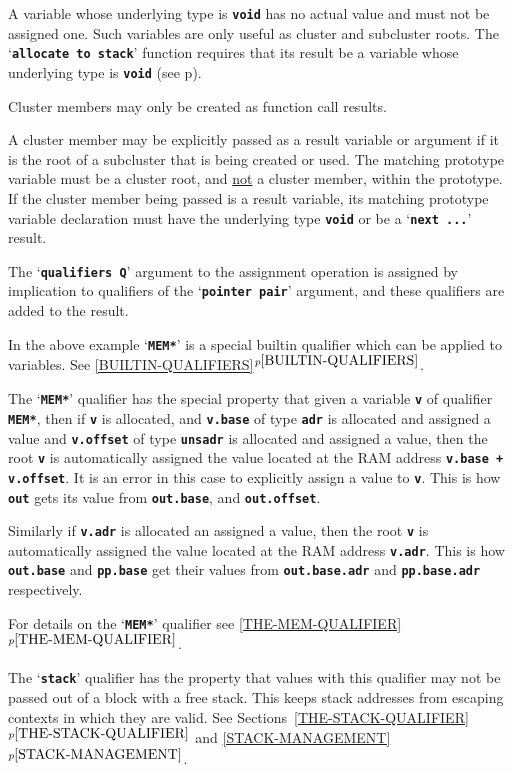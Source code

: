 \documentclass[12pt]{article}
\newcommand{\TT}[1]{{\tt \bfseries #1}}
\newcommand{\itemref}[1]{\ref{#1}$^{p\pageref{#1}}$}
\newcommand{\pagref}[1]{p\pageref{#1}}
\begin{document}
A variable whose underlying type is \TT{void} has no actual value
and must not be assigned one.  Such variables are only useful
as cluster and subcluster roots.  The `\TT{allocate to stack}'
function requires that its result be a variable whose underlying
type is \TT{void} (see \pagref{ALLOCATE-TO-STACK}).

Cluster members may only be created as function call results.

A cluster member may be explicitly passed as a result variable
or argument if it is the root of a subcluster that is being
created or used.  The matching prototype variable must
be a cluster root, and \underline{not} a cluster member,
within the prototype.  If the cluster member being passed is a
result variable, its matching prototype variable declaration must have the
underlying type \TT{void} or be a `\TT{next ...}' result.

The `\TT{qualifiers Q}' argument to the assignment operation
is assigned by implication to qualifiers of the `\TT{pointer pair}'
argument, and these qualifiers are added to the result.

In the above example `\TT{*MEM*}' is a special builtin qualifier
which can be applied to variables.
See \itemref{BUILTIN-QUALIFIERS}.

The `\TT{*MEM*}' qualifier\label{MEM}
has the special property that given a variable
\TT{v} of qualifier \TT{*MEM*}, then if \TT{v} is allocated,
and \TT{v.base} of type \TT{adr}
is allocated and assigned a value
and \TT{v.offset} of type \TT{unsadr}
is allocated and assigned a value, then
the root \TT{v} is automatically
assigned the value located at the RAM address \TT{v.base + v.offset}.
It is an error in this case to explicitly assign a value to \TT{v}.
This is how \TT{out} gets its value from
\TT{out.base}, and \TT{out.offset}.

Similarly if \TT{v.adr} is allocated an assigned a value, then
the root \TT{v} is automatically
assigned the value located at the RAM address \TT{v.adr}.
This is how \TT{out.base} and \TT{pp.base} get their values from
\TT{out.base.adr} and \TT{pp.base.adr} respectively.

For details on the `\TT{*MEM*}' qualifier see \itemref{THE-MEM-QUALIFIER}.

The `\TT{stack}' qualifier has the property that values with
this qualifier may not be passed out of a block with a free
stack.  This keeps stack addresses from escaping contexts in
which they are valid.  See Sections~\itemref{THE-STACK-QUALIFIER} and
\itemref{STACK-MANAGEMENT}.
\end{document}
